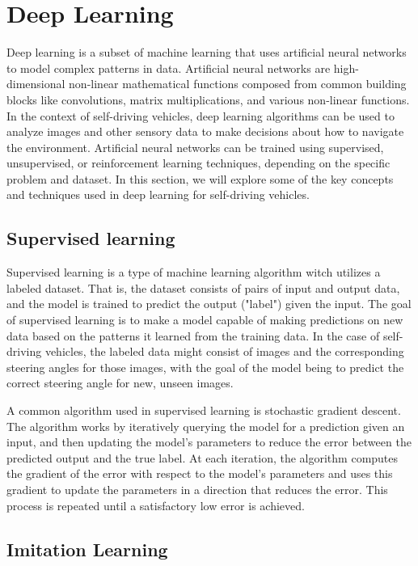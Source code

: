 \section{Deep Learning}

Deep learning is a subset of machine learning that uses artificial neural networks to model complex patterns in data.
Artificial neural networks are high-dimensional non-linear mathematical functions
composed from common building blocks like
convolutions, matrix multiplications, and various non-linear functions.
In the context of self-driving vehicles,
deep learning algorithms can be used to analyze images and other sensory data to make decisions about how to navigate the environment.
Artificial neural networks can be trained using supervised, unsupervised, or reinforcement learning techniques,
depending on the specific problem and dataset.
In this section,
we will explore some of the key concepts and techniques used in deep learning for self-driving vehicles.


\subsection{Supervised learning}
\label{sec:supervised-learning}
Supervised learning is a type of machine learning algorithm witch utilizes a labeled dataset.
That is, the dataset consists of pairs of input and output data,
and the model is trained to predict the output ("label") given the input.
The goal of supervised learning is to make a model
capable of making predictions on new data
based on the patterns it learned from the training data.
In the case of self-driving vehicles,
the labeled data might consist of images and the corresponding steering angles for those images,
with the goal of the model being to predict the correct steering angle for new,
unseen images.

A common algorithm used in supervised learning is stochastic gradient descent.
The algorithm works by iteratively querying the model for a prediction given an input,
and then updating the model's parameters to reduce the error between the predicted output and the true label.
At each iteration, the algorithm computes the gradient of the error with respect to the model's parameters and uses this gradient to update the parameters in a direction that reduces the error.
This process is repeated until a satisfactory low error is achieved.


\subsection{Imitation Learning}

